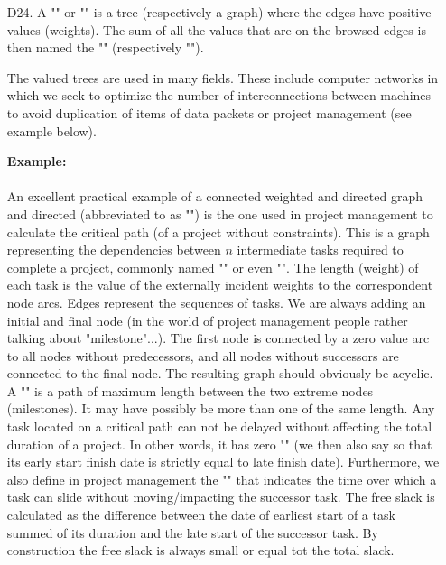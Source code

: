 {\begin{enumerate}
	\item[D24.] A "" or "" is a tree (respectively a graph) where the edges have positive values (weights). The sum of all the values that are on the browsed edges is then named the "" (respectively "").
	
	\begin{tcolorbox}[title=Remark,colframe=black,arc=10pt]
	The valued trees are used in many fields. These include computer networks in which we seek to optimize the number of interconnections between machines to avoid duplication of items of data packets or project management (see example below).
	\end{tcolorbox}	
	\begin{tcolorbox}[colframe=black,colback=white,sharp corners]
	\textbf{{\Large {}}Example:}\\\\
		An excellent practical example of a connected weighted and directed graph and directed (abbreviated to as "") is the one used in project management to calculate the critical path (of a project without constraints). This is a graph representing the dependencies between $n$ intermediate tasks required to complete a project, commonly named "" or even "". The length (weight) of each task is the value of the externally incident weights to the correspondent node arcs. Edges represent the sequences of tasks. We are always adding an initial and final node (in the world of project management people rather talking about "milestone"...). The first node is connected by a zero value arc to all nodes without predecessors, and all nodes without successors are connected to the final node. The resulting graph should obviously be acyclic.\\
		
		A "" is a path of maximum length between the two extreme nodes (milestones). It may have possibly be more than one of the same length. Any task located on a critical path can not be delayed without affecting the total duration of a project. In other words, it has zero "" (we then also say so that its early start finish date is strictly equal to late finish date). Furthermore, we also define in project management the "" that indicates the time over which a task can slide without moving/impacting the successor task. The free slack is calculated as the difference between the date of earliest start of a task summed of its duration and the late start of the successor task. By construction the free slack is always small or equal tot the total slack.\\
		

\end{tcolorbox}
\end{enumerate}}
